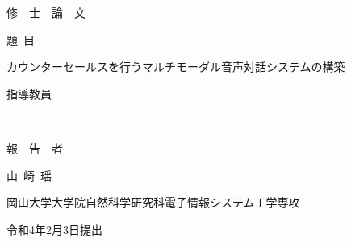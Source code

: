 \pagestyle{empty}

\begin{titlepage}

\vspace*{1cm}

\begin{center}


修\ \ 士\ \ 論\ \ 文

\vspace*{0.8cm}

題\ 目

\vspace*{1cm}

{\large{カウンターセールスを行うマルチモーダル音声対話システムの構築}}

\vspace*{-0.3cm}

\underline{\hspace*{12cm}}

\vspace*{3cm}

指導教員

\vspace*{0.3cm}

{\large{~}}

\vspace*{-0.3cm}

\underline{\hspace*{4cm}}

\vspace*{3cm}

報~~告~~者

\vspace*{0.3cm}

{\large{山~崎~瑶}}

\vspace*{-0.3cm}

\underline{\hspace*{4cm}}

\vspace*{0.5cm}

岡山大学大学院自然科学研究科電子情報システム工学専攻

\vspace*{2cm}

令和4年2月3日提出





\end{center}
\end{titlepage}
\newpage
